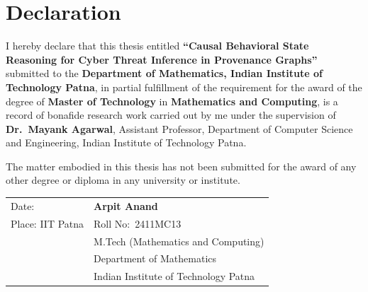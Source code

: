 \chapter*{Declaration}

I hereby declare that this thesis entitled \textbf{``Causal Behavioral State Reasoning for Cyber Threat Inference in Provenance Graphs''} submitted to the \textbf{Department of Mathematics, Indian Institute of Technology Patna}, in partial fulfillment of the requirement for the award of the degree of \textbf{Master of Technology} in \textbf{Mathematics and Computing}, is a record of bonafide research work carried out by me under the supervision of \textbf{Dr.\ Mayank Agarwal}, Assistant Professor, Department of Computer Science and Engineering, Indian Institute of Technology Patna.

The matter embodied in this thesis has not been submitted for the award of any other degree or diploma in any university or institute.

\vfill

\noindent
\begin{tabular}{@{}p{7cm}p{7cm}@{}}
Date: \underline{\hspace{4cm}} & \textbf{Arpit Anand} \\[6pt]
Place: IIT Patna              & Roll No:\ 2411MC13 \\
                               & M.Tech (Mathematics and Computing) \\
                               & Department of Mathematics \\
                               & Indian Institute of Technology Patna \\
\end{tabular}

\vspace{2cm}
